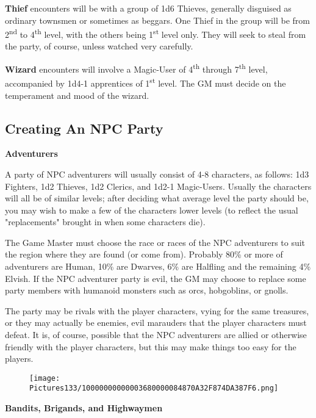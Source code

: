 \documentclass[a4paper,twoside,openany,10pt]{book}
\begin{document}
\begin{multicols}{2}
\textbf{Thief} encounters will be with a group of 1d6 Thieves, generally disguised as ordinary townsmen or sometimes as beggars. One Thief in the group will be from 2\textsuperscript{nd} to 4\textsuperscript{th} level, with the others being 1\textsuperscript{st} level only. They will seek to steal from the party, of course, unless watched very carefully. 

\textbf{Wizard }encounters will involve a Magic-User of 4\textsuperscript{th} through 7\textsuperscript{th} level, accompanied by 1d4-1 apprentices of 1\textsuperscript{st} level. The GM must decide on the temperament and mood of the wizard.

\subsection{Creating An NPC Party}\label{creating-an-npc-party}

\textbf{Adventurers}

A party of NPC adventurers will usually consist of 4-8 characters, as follows: 1d3 Fighters, 1d2 Thieves, 1d2 Clerics, and 1d2-1 Magic-Users. Usually the characters will all be of similar levels; after deciding what average level the party should be, you may wish to make a few of the characters lower levels (to reflect the usual "replacements" brought in when some characters die).

The Game Master must choose the race or races of the NPC adventurers to suit the region where they are found (or come from). Probably 80\% or more of adventurers are Human, 10\% are Dwarves, 6\% are Halfling and the remaining 4\% Elvish. If the NPC adventurer party is evil, the GM may choose to replace some party members with humanoid monsters such as orcs, hobgoblins, or gnolls.

The party may be rivals with the player characters, vying for the same treasures, or they may actually be enemies, evil marauders that the player characters must defeat. It is, of course, possible that the NPC adventurers are allied or otherwise friendly with the player characters, but this may make things too easy for the players.

\begin{wrapfigure}{r}{0.25\textwidth}
	\texttt{[image: Pictures133/10000000000003680000084870A32F874DA387F6.png]} 
\end{wrapfigure}

\textbf{Bandits, Brigands, and Highwaymen}


\end{multicols}
\end{document}
